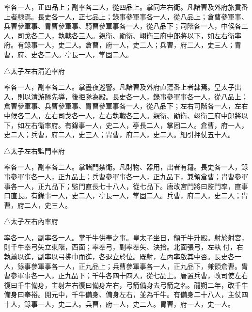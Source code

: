 \begin{pinyinscope}
 率各一人，正四品上；副率各二人，從四品上。掌同左右衛。凡諸曹及外府旅賁番上者隸焉。長史各一人，正七品上；錄事參軍事各一人，從八品上；倉曹參軍事、兵曹參軍事、胄曹參軍事、騎曹參軍事各一人，從八品下；司階各一人，中候各二人，司戈各二人，執戟各三人。親衛、勛衛、翊衛三府中郎將以下，如左右衛率府。有錄事一人，史二人。倉曹，府一人，史二人；兵曹，府二人，史三人；胄曹，府、史各二人。亭長一人，掌固二人。



 △太子左右清道率府



 率各一人，副率各二人。掌晝夜巡警。凡諸曹及外府直蕩番上者隸焉。皇太子出入，則以清游隊先導，後拒隊為殿。長史各一人，錄事參軍事各一人，從八品上；倉曹參軍事、兵曹參軍事、胄曹參軍事各一人，從八品下；左右司階各一人，左右中候各二人，左右司戈各一人，左右執戟各三人。親衛、勛衛、翊衛三府中郎將以下，如左右衛率府。有錄事一人，史二人，亭長二人，掌固二人。倉曹，府一人，史二人；兵曹，府二人，史三人；胄曹，府二人，史二人。細引押仗五十人。



 △太子左右監門率府



 率各一人，副率各二人。掌諸門禁衛。凡財物、器用，出者有籍。長史各一人，錄事參軍事各一人，正九品上；兵曹參軍事各一人，正九品下，兼領倉曹；胄曹參軍事各一人，正九品下；監門直長七十八人，從七品下。唐改宮門將曰監門率，直事曰直長。有錄事一人，史二人，亭長一人，掌固二人。兵曹，府二人，史二人；胄曹，府二人，史三人。



 △太子左右內率府



 率各一人，副率各一人。掌千牛供奉之事。皇太子坐日，領千牛升殿。射於射宮，則千牛奉弓矢立東階，西面；率奉弓，副率奉矢、決拾。北面張弓，左執付，右執蕭以進，副率以弓拂巾而進，各退立於位。既射，左內率啟其中否。長史各一人，錄事參軍事各一人，正九品上；兵曹參軍事各一人，正九品下，兼領倉曹。胄曹參軍事各一人，正九品下；千牛各四十四人，從七品上。唐置兵曹，改司使左右復曰千牛備身，主射左右復曰備身左右，弓箭備身去弓箭之名。龍朔二年，改千牛備身曰奉裕。開元中，千牛備身、備身左右，並為千牛。有備身二十八人，主仗四十人，錄事一人，史二人。兵曹，府一人，史二人。胄曹，府一人，史一人。



\end{pinyinscope}